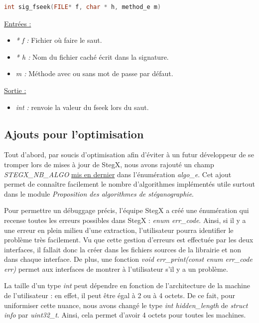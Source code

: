 \documentclass[11pt]{article}
\begin{document}
\begin{lstlisting}[language=c]
int sig_fseek(FILE* f, char * h, method_e m)
\end{lstlisting}
\underline{Entrées :}
\begin{itemize}
\item \textit{* f :} Fichier où faire le saut. 
\item \textit{* h :} Nom du fichier caché écrit dans la signature. 
\item \textit{m :} Méthode avec ou sans mot de passe par défaut. 
\end{itemize}
\underline{Sortie :} 
\begin{itemize}
\item \textit{int :} renvoie la valeur du fseek lors du saut. 
\newline 
\end{itemize}

\newpage
\subsection{Ajouts pour l'optimisation}

Tout d'abord, par soucis d'optimisation afin d'éviter à un futur développeur 
de se tromper lors de mises à jour de StegX, nous avons rajouté un champ 
\textit{STEGX\_NB\_ALGO} \underline{mis en dernier} dans l'énumération \textit{algo\_e}. 
Cet ajout permet de connaître facilement le nombre d'algorithmes implémentés 
utile surtout dans le module \textit{Proposition des algorithmes de stéganographie}. 
\newline

Pour permettre un débuggage précis, l'équipe StegX a créé une énumération qui
recense toutes les erreurs possibles dans StegX : \textit{enum err\_code}. 
Ainsi, si il y a une erreur en plein milieu d'une extraction, l'utilisateur 
pourra identifier le problème très facilement. Vu que cette gestion d'erreurs 
est effectuée par les deux interfaces, il fallait donc la créer dans les 
fichiers sources de la librairie et non dans chaque interface. De plus, 
une fonction \textit{void err\_print(const enum err\_code err)} permet aux 
interfaces de montrer à l'utilisateur s'il y a un problème. 
\newline

La taille d'un type \textit{int} peut dépendre en fonction de l'architecture
de la machine de l'utilisateur : en effet, il peut être égal à 2 ou à 4 octets. 
De ce fait, pour uniformiser cette nuance, nous avons changé le type 
\textit{int hidden\_length} de \textit{struct info} par \textit{uint32\_t}. 
Ainsi, cela permet d'avoir 4 octets pour toutes les machines. 
\newline 
\end{document}
